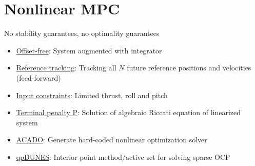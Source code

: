 \ETHslide
\section*{Nonlinear MPC}
\vspace*{\fill}
No stability guarantees, no optimality guarantees
\begin{itemize}
\item[\ETHitem] \underline{Offset-free}: System augmented with integrator
\item[\ETHitem] \underline{Reference tracking}: Tracking all $N$ future reference positions and velocities (feed-forward)
\item[\ETHitem] \underline{Input constraints}: Limited thrust, roll and pitch
\item[\ETHitem] \underline{Terminal penalty P}: Solution of algebraic Riccati equation of linearized system
\item[\ETHitem] \underline{ACADO}: Generate hard-coded nonlinear optimization solver
\item[\ETHitem] \underline{qpDUNES}: Interior point method/active set for solving sparse OCP
\end{itemize}

\vspace*{\fill}
\clearpage
